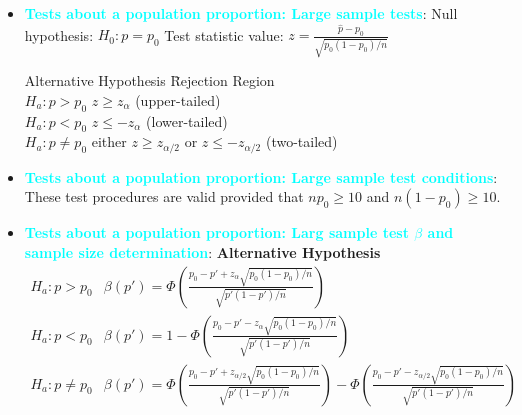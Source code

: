\documentclass{report}
\begin{document}
\begin{itemize}
    \item \textbf{\textcolor{cyan}{Tests about a population proportion: Large sample tests}}:
        \bigbreak \noindent 
        Null hypothesis: $H_0: p = p_0$
        \bigbreak \noindent 
        Test statistic value: $z = \frac{\hat{p} - p_0}{\sqrt{p_0 (1 - p_0) / n}}$
        \bigbreak \noindent 
        \begin{tabbing}
            Alternative Hypothesis \hspace{2cm} \= Rejection Region \\
            $H_a: p > p_0$ \> $z \geq z_\alpha$ (upper-tailed) \\
            $H_a: p < p_0$ \> $z \leq -z_\alpha$ (lower-tailed) \\
            $H_a: p \neq p_0$ \> either $z \geq z_{\alpha/2}$ or $z \leq -z_{\alpha/2}$ (two-tailed) \\
        \end{tabbing}
        \bigbreak \noindent 
    \item \textbf{\textcolor{cyan}{Tests about a population proportion: Large sample test conditions}}: 
        These test procedures are valid provided that $np_0 \geq 10$ and $n(1 - p_0) \geq 10$.
        \item \textbf{\textcolor{cyan}{Tests about a population proportion: Larg sample test $\beta$ and sample size determination}}:
            \bigbreak \noindent 
            \textbf{Alternative Hypothesis}
            \bigbreak \noindent 
            \[
                \begin{array}{ll}
                    H_a: p > p_0 & \beta(p') = \Phi \left( \frac{p_0 - p' + z_\alpha \sqrt{p_0(1 - p_0)/n}}{\sqrt{p'(1 - p')/n}} \right) \\
                    H_a: p < p_0 & \beta(p') = 1 - \Phi \left( \frac{p_0 - p' - z_\alpha \sqrt{p_0(1 - p_0)/n}}{\sqrt{p'(1 - p')/n}} \right) \\
                    H_a: p \neq p_0 & \beta(p') = \Phi \left( \frac{p_0 - p' + z_{\alpha/2} \sqrt{p_0(1 - p_0)/n}}{\sqrt{p'(1 - p')/n}} \right) - \Phi \left( \frac{p_0 - p' - z_{\alpha/2} \sqrt{p_0(1 - p_0)/n}}{\sqrt{p'(1 - p')/n}} \right)

\end{array}\]
\end{itemize}
\end{document}
